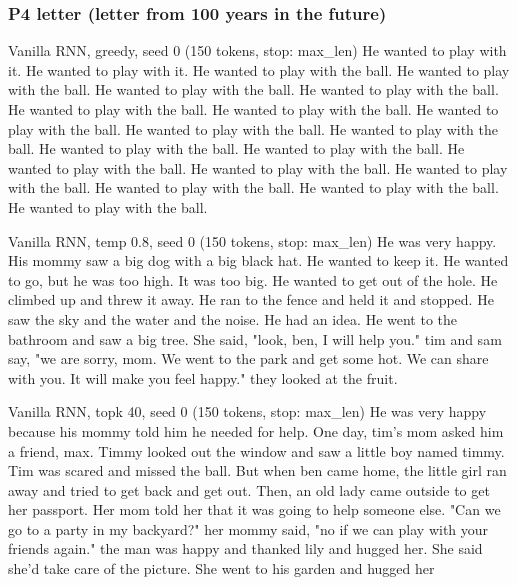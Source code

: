 \subsubsection*{P4 letter (letter from 100 years in the future)}

\begin{modelout}{Vanilla RNN, greedy, seed 0 (150 tokens, stop: max\_len)}
\small He wanted to play with it. He wanted to play with it. He wanted to play with the ball. He wanted to play with the ball. He wanted to play with the ball. He wanted to play with the ball. He wanted to play with the ball. He wanted to play with the ball. He wanted to play with the ball. He wanted to play with the ball. He wanted to play with the ball. He wanted to play with the ball. He wanted to play with the ball. He wanted to play with the ball. He wanted to play with the ball. He wanted to play with the ball. He wanted to play with the ball. He wanted to play with the ball. He wanted to play with the ball.
\end{modelout}

\begin{modelout}{Vanilla RNN, temp 0.8, seed 0 (150 tokens, stop: max\_len)}
\small He was very happy. His mommy saw a big dog with a big black hat. He wanted to keep it. He wanted to go, but he was too high. It was too big. He wanted to get out of the hole. He climbed up and threw it away. He ran to the fence and held it and stopped. He saw the sky and the water and the noise. He had an idea. He went to the bathroom and saw a big tree. She said, "look, ben, I will help you." tim and sam say, "we are sorry, mom. We went to the park and get some hot. We can share with you. It will make you feel happy." they looked at the fruit.
\end{modelout}

\begin{modelout}{Vanilla RNN, topk 40, seed 0 (150 tokens, stop: max\_len)}
\small He was very happy because his mommy told him he needed for help. One day, tim's mom asked him a friend, max. Timmy looked out the window and saw a little boy named timmy. Tim was scared and missed the ball. But when ben came home, the little girl ran away and tried to get back and get out. Then, an old lady came outside to get her passport. Her mom told her that it was going to help someone else. "Can we go to a party in my backyard?" her mommy said, "no if we can play with your friends again." the man was happy and thanked lily and hugged her. She said she'd take care of the picture. She went to his garden and hugged her
\end{modelout}

